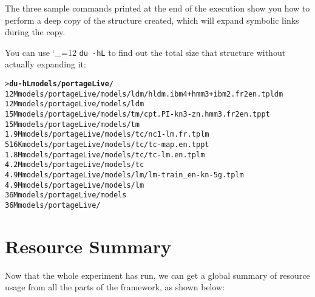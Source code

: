 \documentclass[11pt,letterpaper]{article}
\def\code{\begingroup\catcode`\_=12 \codex}
\newcommand{\codex}[1]{\texttt{#1}\endgroup}
\begin{document}
The three sample commands printed at the end of the execution show you how to
perform a deep copy of the structure created, which will expand symbolic links
during the copy.

You can use \code{du -hL} to find out the total size that structure without
actually expanding it:
\begin{small}
\begin{alltt}
   > \textbf{du -hL models/portageLive/}
   12M     models/portageLive/models/ldm/hldm.ibm4+hmm3+ibm2.fr2en.tpldm
   12M     models/portageLive/models/ldm
   15M     models/portageLive/models/tm/cpt.PI-kn3-zn.hmm3.fr2en.tppt
   15M     models/portageLive/models/tm
   1.9M    models/portageLive/models/tc/nc1-lm.fr.tplm
   516K    models/portageLive/models/tc/tc-map.en.tppt
   1.8M    models/portageLive/models/tc/tc-lm.en.tplm
   4.2M    models/portageLive/models/tc
   4.9M    models/portageLive/models/lm/lm-train_en-kn-5g.tplm
   4.9M    models/portageLive/models/lm
   36M     models/portageLive/models
   36M     models/portageLive/
\end{alltt}
\end{small}


\section{Resource Summary}

Now that the whole experiment has run, we can get a global summary of resource
usage from all the parts of the framework, as shown below:
\end{document}
